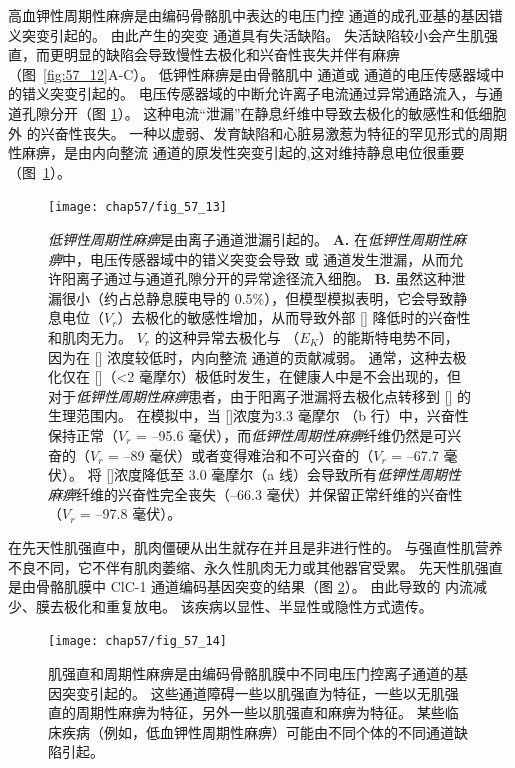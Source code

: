 高血钾性周期性麻痹是由编码骨骼肌中表达的电压门控  通道的成孔亚基的基因错义突变引起的。
由此产生的突变  通道具有失活缺陷。
失活缺陷较小会产生肌强直，而更明显的缺陷会导致慢性去极化和兴奋性丧失并伴有麻痹（图~\ref{fig:57_12}A-C）。
低钾性麻痹是由骨骼肌中  通道或  通道的电压传感器域中的错义突变引起的。
电压传感器域的中断允许离子电流通过异常通路流入，与通道孔隙分开（图 \ref{fig:57_13}）。
这种电流“泄漏”在静息纤维中导致去极化的敏感性和低细胞外  的兴奋性丧失。
一种以虚弱、发育缺陷和心脏易激惹为特征的罕见形式的周期性麻痹，是由内向整流  通道的原发性突变引起的,这对维持静息电位很重要（图~\ref{fig:57_13}）。


\begin{figure}[htbp]
	\centering
	\texttt{[image: chap57/fig\_57\_13]}
	\caption{\textit{低钾性周期性麻痹}是由离子通道泄漏引起的。
		\textbf{A.} 在\textit{低钾性周期性麻痹}中，电压传感器域中的错义突变会导致  或  通道发生泄漏，从而允许阳离子通过与通道孔隙分开的异常途径流入细胞。
		\textbf{B.} 虽然这种泄漏很小（约占总静息膜电导的 0.5\%），但模型模拟表明，它会导致静息电位（$V_r$）去极化的敏感性增加，从而导致外部 [] 降低时的兴奋性和肌肉无力。
		$V_r$ 的这种异常去极化与 （$E_K$）的能斯特电势不同，因为在 [] 浓度较低时，内向整流  通道的贡献减弱。
		通常，这种去极化仅在 []（<2 毫摩尔）极低时发生，在健康人中是不会出现的，但对于\textit{低钾性周期性麻痹}患者，由于阳离子泄漏将去极化点转移到 [] 的生理范围内。
		在模拟中，当 []浓度为3.3 毫摩尔 （b 行）中，兴奋性保持正常（$V_r$ = –95.6 毫伏），而\textit{低钾性周期性麻痹}纤维仍然是可兴奋的（$V_r$ = –89 毫伏）或者变得难治和不可兴奋的（$V_r$ = –67.7 毫伏）。
		将 []浓度降低至 3.0 毫摩尔（a 线）会导致所有\textit{低钾性周期性麻痹}纤维的兴奋性完全丧失（–66.3 毫伏）并保留正常纤维的兴奋性（$V_r$ = –97.8 毫伏）\cite{cannon2018sodium}。}
	\label{fig:57_13}
\end{figure}


在先天性肌强直中，肌肉僵硬从出生就存在并且是非进行性的。
与强直性肌营养不良不同，它不伴有肌肉萎缩、永久性肌肉无力或其他器官受累。
先天性肌强直是由骨骼肌膜中 ClC-1  通道编码基因突变的结果（图 \ref{fig:57_14}）。
由此导致的  内流减少、膜去极化和重复放电。
该疾病以显性、半显性或隐性方式遗传。


\begin{figure}[htbp]
	\centering
	\texttt{[image: chap57/fig\_57\_14]}
	\caption{肌强直和周期性麻痹是由编码骨骼肌膜中不同电压门控离子通道的基因突变引起的。
		这些通道障碍一些以肌强直为特征，一些以无肌强直的周期性麻痹为特征，另外一些以肌强直和麻痹为特征。
		某些临床疾病（例如，低血钾性周期性麻痹）可能由不同个体的不同通道缺陷引起。}
	\label{fig:57_14}
\end{figure}



